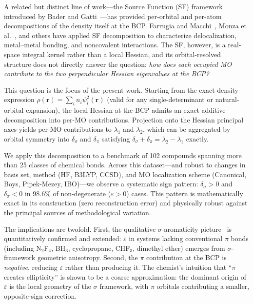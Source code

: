 \documentclass[11pt,a4paper]{article}
\newcommand{\delsg}{\delta_{\sigma}}
\newcommand{\delpi}{\delta_{\pi}}
\newcommand{\eps}{\varepsilon}
\begin{document}
A related but distinct line of work---the Source Function (SF)
framework introduced by Bader and Gatti~\citep{BaderGatti1998}---has
provided per-orbital and per-atom decompositions of the density
itself at the BCP. Farrugia and Macchi~\citep{Farrugia2009},
Monza et al.~\citep{Monza2011}, and others have applied SF
decomposition to characterize delocalization, metal--metal bonding,
and noncovalent interactions. The SF, however, is a real-space
integral kernel rather than a local Hessian, and its
orbital-resolved structure does not directly answer the
question: \emph{how does each occupied MO contribute to the two
perpendicular Hessian eigenvalues at the BCP?}

This question is the focus of the present work. Starting from the
exact density expression $\rho(\mathbf{r}) = \sum_i n_i \psi_i^2(\mathbf{r})$
(valid for any single-determinant or natural-orbital expansion), the
local Hessian at the BCP admits an exact additive decomposition into
per-MO contributions. Projection onto the Hessian principal axes
yields per-MO contributions to $\lambda_1$ and $\lambda_2$, which
can be aggregated by orbital symmetry into $\delsg$ and $\delpi$
satisfying $\delsg + \delpi = \lambda_2 - \lambda_1$ exactly.

We apply this decomposition to a benchmark of 102 compounds spanning
more than 25 classes of chemical bonds. Across this dataset---and
robust to changes in basis set, method (HF, B3LYP, CCSD), and MO
localization scheme (Canonical, Boys, Pipek-Mezey, IBO)---we observe
a systematic sign pattern: $\delsg > 0$ and $\delpi < 0$ in 98.6\% of
non-degenerate ($\eps > 0$) cases. This pattern is mathematically
exact in its construction (zero reconstruction error) and physically
robust against the principal sources of methodological variation.

The implications are twofold. First, the qualitative
$\sigma$-aromaticity picture~\citep{Walsh1947,Cremer1988,Brown2009}
is quantitatively confirmed and extended: $\eps$ in systems lacking
conventional $\pi$ bonds (including N$_2$F$_4$, BH$_3$,
cyclopropane, CHF$_3$, dimethyl ether) emerges from $\sigma$-framework
geometric anisotropy. Second, the $\pi$ contribution at the BCP is
\emph{negative}, reducing $\eps$ rather than producing it. The
chemist's intuition that ``$\pi$ creates ellipticity'' is shown to
be a coarse approximation: the dominant origin of $\eps$ is the
local geometry of the $\sigma$ framework, with $\pi$ orbitals
contributing a smaller, opposite-sign correction.
\end{document}
